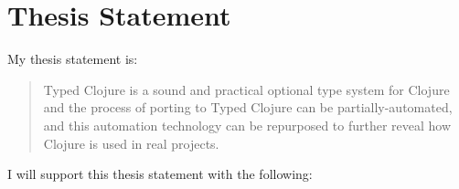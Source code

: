 \documentclass[9pt]{extarticle}
\begin{document}
\section{Thesis Statement}

My thesis statement is:

\begin{quote}
Typed Clojure is a sound and practical optional type system for Clojure and the process of porting to Typed Clojure can be partially-automated, and this automation technology can be repurposed to further reveal how Clojure is used in real projects.
\end{quote}

I will support this thesis statement with the following:
\end{document}
